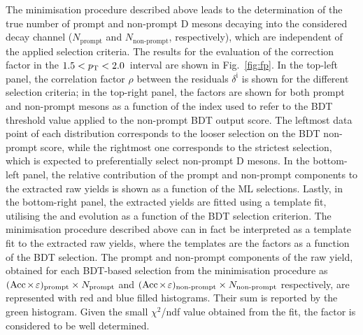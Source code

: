 The minimisation procedure described above leads to the determination of the true number of prompt and non-prompt D mesons decaying into the considered decay channel ($N_\mathrm{prompt}$ and $N_\mathrm{non\text{-}prompt}$, respectively), which are independent of the applied selection criteria. The results for the evaluation of the \ds \fp correction factor in the $1.5<p_\mathrm{T}<2.0$~\gevc interval are shown in Fig.~\ref{fig:fp}. In the top-left panel, the correlation factor $\rho$ between the residuals $\delta^\mathrm{i}$ is shown for the different selection criteria; in the top-right panel, the \aeff factors are shown for both prompt and non-prompt \ds mesons as a function of the index used to refer to the BDT threshold value applied to the non-prompt BDT output score. The leftmost data point of each distribution corresponds to the looser selection on the BDT non-prompt score, while the rightmost one corresponds to the strictest selection, which is expected to preferentially select non-prompt D mesons. In the bottom-left panel, the relative contribution of the prompt and non-prompt components to the extracted \ds raw yields is shown as a function of the ML selections. Lastly, in the bottom-right panel, the extracted yields are fitted using a template fit, utilising the \aeffpds and \aeffnpds evolution as a function of the BDT selection criterion. The minimisation procedure described above can in fact be interpreted as a template fit to the extracted raw yields, where the templates are the \aeff factors as a function of the BDT selection. The prompt and non-prompt components of the raw yield, obtained for each BDT-based selection from the minimisation procedure as \mbox{$(\mathrm{Acc}\mkern-2mu\times\mkern-2mu\varepsilon)_\mathrm{prompt}\times N_\mathrm{prompt}$} and $(\mathrm{Acc}\mkern-2mu\times\mkern-2mu\varepsilon)_\mathrm{non\text{-}prompt}\times N_\mathrm{non\text{-}prompt}$ respectively, are represented with red and blue filled histograms. Their sum is reported by the green histogram. Given the small $\chi^2$/ndf value obtained from the fit, the \fp factor is considered to be well determined. 
